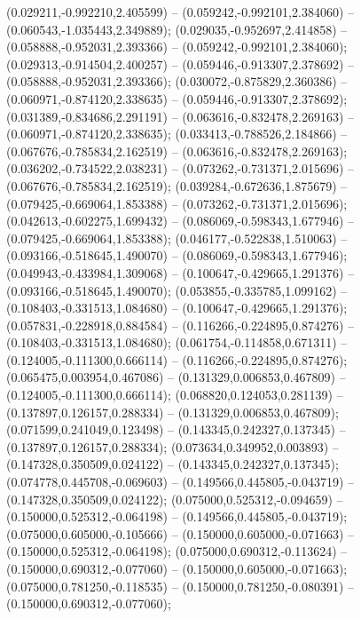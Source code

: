  (0.029211,-0.992210,2.405599) -- (0.059242,-0.992101,2.384060) -- (0.060543,-1.035443,2.349889);
 (0.029035,-0.952697,2.414858) -- (0.058888,-0.952031,2.393366) -- (0.059242,-0.992101,2.384060);
 (0.029313,-0.914504,2.400257) -- (0.059446,-0.913307,2.378692) -- (0.058888,-0.952031,2.393366);
 (0.030072,-0.875829,2.360386) -- (0.060971,-0.874120,2.338635) -- (0.059446,-0.913307,2.378692);
 (0.031389,-0.834686,2.291191) -- (0.063616,-0.832478,2.269163) -- (0.060971,-0.874120,2.338635);
 (0.033413,-0.788526,2.184866) -- (0.067676,-0.785834,2.162519) -- (0.063616,-0.832478,2.269163);
 (0.036202,-0.734522,2.038231) -- (0.073262,-0.731371,2.015696) -- (0.067676,-0.785834,2.162519);
 (0.039284,-0.672636,1.875679) -- (0.079425,-0.669064,1.853388) -- (0.073262,-0.731371,2.015696);
 (0.042613,-0.602275,1.699432) -- (0.086069,-0.598343,1.677946) -- (0.079425,-0.669064,1.853388);
 (0.046177,-0.522838,1.510063) -- (0.093166,-0.518645,1.490070) -- (0.086069,-0.598343,1.677946);
 (0.049943,-0.433984,1.309068) -- (0.100647,-0.429665,1.291376) -- (0.093166,-0.518645,1.490070);
 (0.053855,-0.335785,1.099162) -- (0.108403,-0.331513,1.084680) -- (0.100647,-0.429665,1.291376);
 (0.057831,-0.228918,0.884584) -- (0.116266,-0.224895,0.874276) -- (0.108403,-0.331513,1.084680);
 (0.061754,-0.114858,0.671311) -- (0.124005,-0.111300,0.666114) -- (0.116266,-0.224895,0.874276);
 (0.065475,0.003954,0.467086) -- (0.131329,0.006853,0.467809) -- (0.124005,-0.111300,0.666114);
 (0.068820,0.124053,0.281139) -- (0.137897,0.126157,0.288334) -- (0.131329,0.006853,0.467809);
 (0.071599,0.241049,0.123498) -- (0.143345,0.242327,0.137345) -- (0.137897,0.126157,0.288334);
 (0.073634,0.349952,0.003893) -- (0.147328,0.350509,0.024122) -- (0.143345,0.242327,0.137345);
 (0.074778,0.445708,-0.069603) -- (0.149566,0.445805,-0.043719) -- (0.147328,0.350509,0.024122);
 (0.075000,0.525312,-0.094659) -- (0.150000,0.525312,-0.064198) -- (0.149566,0.445805,-0.043719);
 (0.075000,0.605000,-0.105666) -- (0.150000,0.605000,-0.071663) -- (0.150000,0.525312,-0.064198);
 (0.075000,0.690312,-0.113624) -- (0.150000,0.690312,-0.077060) -- (0.150000,0.605000,-0.071663);
 (0.075000,0.781250,-0.118535) -- (0.150000,0.781250,-0.080391) -- (0.150000,0.690312,-0.077060);
